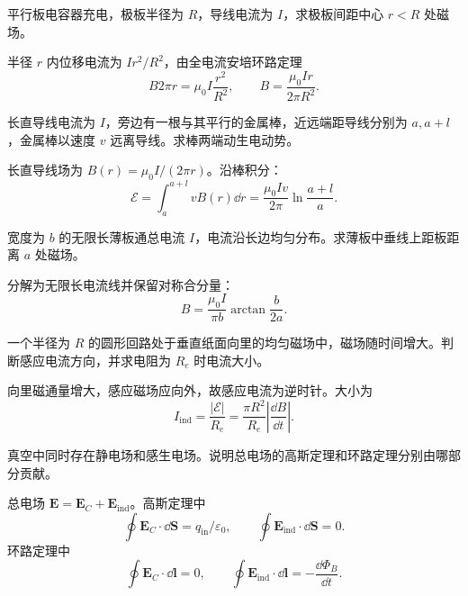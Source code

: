 \begin{exercise}[level=standard]
平行板电容器充电，极板半径为 $R$，导线电流为 $I$，求极板间距中心 $r<R$ 处磁场。
\begin{solution}
半径 $r$ 内位移电流为 $I r^2/R^2$，由全电流安培环路定理
\[
  B2\pi r=\mu_0I\frac{r^2}{R^2},\qquad
  B=\frac{\mu_0Ir}{2\pi R^2}.
\]
\end{solution}
\end{exercise}

\begin{exercise}[level=advanced]
长直导线电流为 $I$，旁边有一根与其平行的金属棒，近远端距导线分别为 $a,a+l$，金属棒以速度 $v$ 远离导线。求棒两端动生电动势。
\begin{solution}
长直导线场为 $B(r)=\mu_0I/(2\pi r)$。沿棒积分：
\[
  \mathcal E=\int_a^{a+l}vB(r)\dd r
  =\frac{\mu_0Iv}{2\pi}\ln\frac{a+l}{a}.
\]
\end{solution}
\end{exercise}

\begin{exercise}[level=advanced]
宽度为 $b$ 的无限长薄板通总电流 $I$，电流沿长边均匀分布。求薄板中垂线上距板距离 $a$ 处磁场。
\begin{solution}
分解为无限长电流线并保留对称合分量：
\[
  B=\frac{\mu_0I}{\pi b}\arctan\frac{b}{2a}.
\]
\end{solution}
\end{exercise}

\begin{exercise}[level=advanced]
一个半径为 $R$ 的圆形回路处于垂直纸面向里的均匀磁场中，磁场随时间增大。判断感应电流方向，并求电阻为 $R_e$ 时电流大小。
\begin{solution}
向里磁通量增大，感应磁场应向外，故感应电流为逆时针。大小为
\[
  I_{\mathrm{ind}}=\frac{|\mathcal E|}{R_e}
  =\frac{\pi R^2}{R_e}\left|\frac{\dd B}{\dd t}\right|.
\]
\end{solution}
\end{exercise}

\begin{exercise}[level=advanced]
真空中同时存在静电场和感生电场。说明总电场的高斯定理和环路定理分别由哪部分贡献。
\begin{solution}
总电场 $\bm E=\bm E_C+\bm E_{\mathrm{ind}}$。高斯定理中
\[
  \oint\bm E_C\cdot\dd\bm S=q_{\mathrm{in}}/\varepsilon_0,\qquad
  \oint\bm E_{\mathrm{ind}}\cdot\dd\bm S=0.
\]
环路定理中
\[
  \oint\bm E_C\cdot\dd\bm l=0,\qquad
  \oint\bm E_{\mathrm{ind}}\cdot\dd\bm l=-\frac{\dd\Phi_B}{\dd t}.
\]
\end{solution}
\end{exercise}


